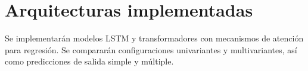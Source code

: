 \section{Arquitecturas implementadas}

Se implementarán modelos LSTM y transformadores con mecanismos de atención para regresión. Se compararán configuraciones univariantes y multivariantes, así como predicciones de salida simple y múltiple.

